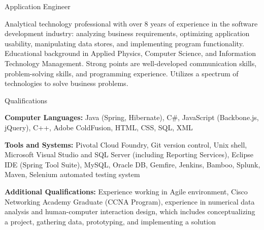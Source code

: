 



\vspace{1mm}

\begin{Large}\textsf{Application Engineer}\end{Large} \vspace{-2mm}

\begin{itemize1}
	\item Analytical technology professional with over 8 years of experience in the software development industry: analyzing business requirements, optimizing application usability, manipulating data stores, and implementing program functionality.  Educational background in Applied Physics, Computer Science, and Information Technology Management. Strong points are well-developed communication skills, problem-solving skills, and programming experience. Utilizes a spectrum of technologies to solve business problems.
\end{itemize1}

\begin{Large}\textsf{Qualifications}\end{Large} \vspace{-2mm}

\begin{itemize1}
	\item \textbf{Computer Languages:} Java (Spring, Hibernate), C\#, JavaScript (Backbone.js, jQuery), C++, Adobe ColdFusion, HTML, CSS, SQL, XML \vspace{2mm}
	\item \textbf{Tools and Systems:} Pivotal Cloud Foundry, Git version control, Unix shell, Microsoft Visual Studio and SQL Server (including Reporting Services), Eclipse IDE (Spring Tool Suite), MySQL, Oracle DB, Gemfire, Jenkins, Bamboo, Splunk, Maven, Selenium automated testing system \vspace{2mm}
	\item \textbf{Additional Qualifications:} Experience working in Agile environment, Cisco Networking Academy Graduate (CCNA Program), experience in numerical data analysis and human-computer interaction design, which includes conceptualizing a project, gathering data, prototyping, and implementing a solution
\end{itemize1}

